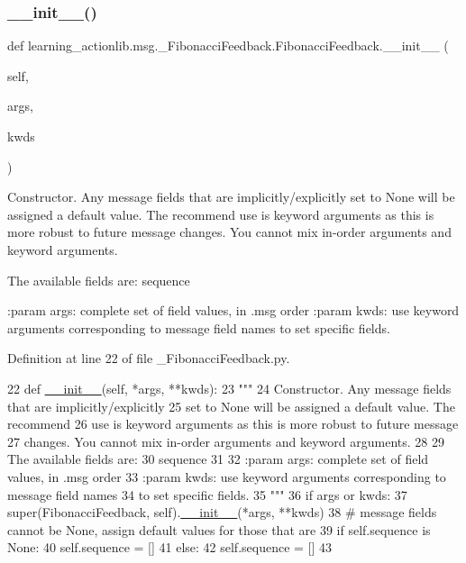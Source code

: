 \subsubsection{\texorpdfstring{\+\_\+\+\_\+init\+\_\+\+\_\+()}{\_\_init\_\_()}}
{\footnotesize\ttfamily def learning\+\_\+actionlib.\+msg.\+\_\+\+Fibonacci\+Feedback.\+Fibonacci\+Feedback.\+\_\+\+\_\+init\+\_\+\+\_\+ (\begin{DoxyParamCaption}\item[{}]{self,  }\item[{}]{args,  }\item[{}]{kwds }\end{DoxyParamCaption})}

\begin{DoxyVerb}Constructor. Any message fields that are implicitly/explicitly
set to None will be assigned a default value. The recommend
use is keyword arguments as this is more robust to future message
changes.  You cannot mix in-order arguments and keyword arguments.

The available fields are:
   sequence

:param args: complete set of field values, in .msg order
:param kwds: use keyword arguments corresponding to message field names
to set specific fields.
\end{DoxyVerb}
 

Definition at line 22 of file \+\_\+\+Fibonacci\+Feedback.\+py.


\begin{DoxyCode}
22   \textcolor{keyword}{def }\hyperlink{classstate__machine_1_1Play_a5993a23d8be7f7b2647f71ede0334957}{\_\_init\_\_}(self, *args, **kwds):
23     \textcolor{stringliteral}{"""}
24 \textcolor{stringliteral}{    Constructor. Any message fields that are implicitly/explicitly}
25 \textcolor{stringliteral}{    set to None will be assigned a default value. The recommend}
26 \textcolor{stringliteral}{    use is keyword arguments as this is more robust to future message}
27 \textcolor{stringliteral}{    changes.  You cannot mix in-order arguments and keyword arguments.}
28 \textcolor{stringliteral}{}
29 \textcolor{stringliteral}{    The available fields are:}
30 \textcolor{stringliteral}{       sequence}
31 \textcolor{stringliteral}{}
32 \textcolor{stringliteral}{    :param args: complete set of field values, in .msg order}
33 \textcolor{stringliteral}{    :param kwds: use keyword arguments corresponding to message field names}
34 \textcolor{stringliteral}{    to set specific fields.}
35 \textcolor{stringliteral}{    """}
36     \textcolor{keywordflow}{if} args \textcolor{keywordflow}{or} kwds:
37       super(FibonacciFeedback, self).\hyperlink{classstate__machine_1_1Play_a5993a23d8be7f7b2647f71ede0334957}{\_\_init\_\_}(*args, **kwds)
38       \textcolor{comment}{# message fields cannot be None, assign default values for those that are}
39       \textcolor{keywordflow}{if} self.sequence \textcolor{keywordflow}{is} \textcolor{keywordtype}{None}:
40         self.sequence = []
41     \textcolor{keywordflow}{else}:
42       self.sequence = []
43 
\end{DoxyCode}


